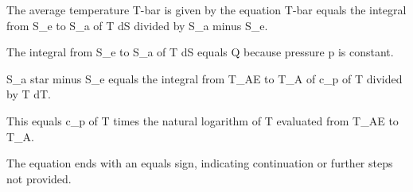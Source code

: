 The average temperature T-bar is given by the equation T-bar equals the integral from S_e to S_a of T dS divided by S_a minus S_e.

The integral from S_e to S_a of T dS equals Q because pressure p is constant.

S_a star minus S_e equals the integral from T_AE to T_A of c_p of T divided by T dT.

This equals c_p of T times the natural logarithm of T evaluated from T_AE to T_A.

The equation ends with an equals sign, indicating continuation or further steps not provided.